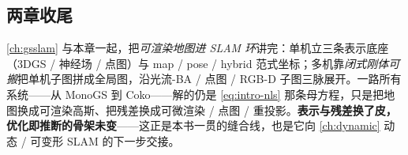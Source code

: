 \subsection{两章收尾}

\cref{ch:gsslam} 与本章一起，把\emph{可渲染地图进 SLAM 环}讲完：单机立三条表示底座（3DGS / 神经场 / 点图）与 map / pose / hybrid 范式坐标；多机靠\emph{闭式刚体可搬}把单机子图拼成全局图，沿光流-BA / 点图 / RGB-D 子图三脉展开。一路所有系统——从 MonoGS 到 Coko——解的仍是 \cref{eq:intro-nls} 那条母方程，只是把地图换成可渲染高斯、把残差换成可微渲染 / 点图 / 重投影。\textbf{表示与残差换了皮，优化即推断的骨架未变}——这正是本书一贯的缝合线，也是它向 \cref{ch:dynamic} 动态 / 可变形 SLAM 的下一步交接。
